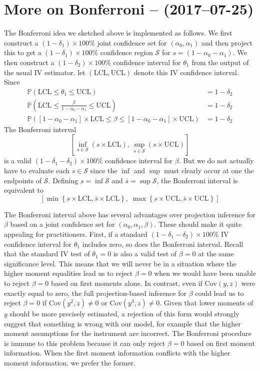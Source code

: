 \documentclass[12pt]{article}
\begin{document}
\section{More on Bonferroni -- (2017--07-25)}
The Bonferroni idea we sketched above is implemented as follows.
We first construct a $(1 - \delta_1)\times 100 \%$ joint confidence set for $(\alpha_0, \alpha_1)$ and then project this to get a $(1 - \delta_1)\times 100 \%$ confidence region $\mathscr{S}$ for $s = (1 - \alpha_0 - \alpha_1)$.
We then construct a $(1 - \delta_2)\times 100\%$ confidence interval for $\theta_1$ from the output of the usual IV estimator.
let $(\mbox{LCL}, \mbox{UCL})$ denote this IV confidence interval.
Since
\begin{align*}
  \mathbb{P}\left( \mbox{LCL} \leq \theta_1 \leq \mbox{UCL} \right) &= 1 - \delta_2\\
  \mathbb{P}\left( \mbox{LCL} \leq \frac{\beta}{1 - \alpha_0 - \alpha_1} \leq \mbox{UCL} \right) &= 1 - \delta_2\\
  \mathbb{P}\left( \left[ 1 - \alpha_0 - \alpha_1 \right] \times \mbox{LCL} \leq \beta \leq \left[ 1 - \alpha_0 - \alpha_1 \right] \times \mbox{UCL} \right) &= 1 - \delta_2
\end{align*}
The Bonferroni interval
\[
\left[\inf_{s \in \mathscr{S}} (s \times \mbox{LCL}),\, \sup_{s \in \mathscr{S}} (s \times \mbox{UCL})\right] 
\]
is a valid $(1 - \delta_1 - \delta_2) \times 100\%$ confidence interval for $\beta$.
But we do not actually have to evaluate each $s \in \mathscr{S}$ since the $\inf$ and $\sup$ must clearly occur at one the endpoints of $\mathscr{S}$.
Defining $\underbar{s} =\inf \mathscr{S}$ and $\bar{s} = \sup \mathscr{S}$, the Bonferroni interval is equivalent to
\[
  \left[\min\left\{\underbar{s} \times \mbox{LCL}, \bar{s} \times \mbox{LCL}  \right\}, \; 
\max\left\{\underbar{s} \times \mbox{UCL}, \bar{s} \times \mbox{UCL}  \right\} \right]
\]

The Bonferroni interval above has several advantages over projection inference for $\beta$ based on a joint confidence set for $(\alpha_0, \alpha_1, \beta)$.
These should make it quite appealing for practitioners.
First, if a standard $(1 - \delta_1 - \delta_2)\times 100\%$ IV confidence interval for $\theta_1$ includes zero, so does the Bonferroni interval. 
Recall that the standard IV test of $\theta_1 = 0$ is also a valid test of $\beta = 0$ at the same significance level. 
This means that we will never be in a situation where the higher moment equalities lead us to reject $\beta = 0$ when we would have been unable to reject $\beta = 0$ based on first moments alone.
In contrast, even if $\mbox{Cov}(y,z)$ were exactly equal to zero, the full projection-based inference for $\beta$ could lead us to reject $\beta=0$ if $\mbox{Cov}(y^2,z)\neq 0$ or $\mbox{Cov}(y^3,z) \neq 0$.
Given that lower moments of $y$ should be more precisely estimated, a rejection of this form would strongly suggest that something is wrong with our model, for example that the higher moment assumptions for the instrument are incorrect.
The Bonferroni procedure is immune to this problem because it can only reject $\beta = 0$ based on first moment information.
When the first moment information conflicts with the higher moment information, we prefer the former.
\end{document}
